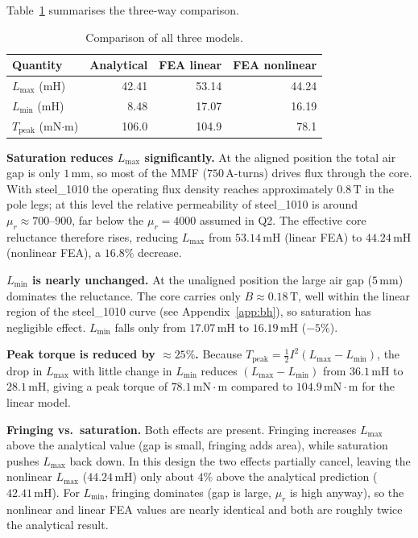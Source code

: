 \documentclass[12pt,a4paper]{article}
\newcommand{\unit}[1]{\,\mathrm{#1}}
\begin{document}
Table~\ref{tab:nl_comparison} summarises the three-way comparison.

\begin{table}[H]
  \centering
  \caption{Comparison of all three models.}
  \label{tab:nl_comparison}
  \renewcommand{\arraystretch}{1.3}
  \begin{tabular}{|l|r|r|r|}
    \hline
    \textbf{Quantity} & \textbf{Analytical} & \textbf{FEA linear} & \textbf{FEA nonlinear} \\
    \hline
    $L_{\max}$ (mH)                   & 42.41 & 53.14 & 44.24 \\
    $L_{\min}$ (mH)                   &  8.48 & 17.07 & 16.19 \\
    $T_{\mathrm{peak}}$ (mN$\cdot$m)  & 106.0 & 104.9 & 78.1  \\
    \hline
  \end{tabular}
\end{table}

\textbf{Saturation reduces $L_{\max}$ significantly.}
At the aligned position the total air gap is only $1\unit{mm}$, so most
of the MMF ($750\unit{A\text{-}turns}$) drives flux through the core.
With steel\_1010 the operating flux density reaches approximately
$0.8\unit{T}$ in the pole legs; at this level the relative permeability
of steel\_1010 is around $\mu_r \approx 700\text{--}900$, far below the
$\mu_r = 4000$ assumed in Q2.  The effective core reluctance therefore
rises, reducing $L_{\max}$ from $53.14\unit{mH}$ (linear FEA) to
$44.24\unit{mH}$ (nonlinear FEA), a $16.8\%$ decrease.

\textbf{$L_{\min}$ is nearly unchanged.}
At the unaligned position the large air gap ($5\unit{mm}$) dominates
the reluctance.  The core carries only $B \approx 0.18\unit{T}$, well
within the linear region of the steel\_1010 curve (see
Appendix~\ref{app:bh}), so saturation has negligible effect.
$L_{\min}$ falls only from $17.07\unit{mH}$ to $16.19\unit{mH}$
($-5\%$).

\textbf{Peak torque is reduced by $\approx 25\%$.}
Because $T_{\mathrm{peak}} = \tfrac{1}{2}I^{2}(L_{\max}-L_{\min})$,
the drop in $L_{\max}$ with little change in $L_{\min}$ reduces
$(L_{\max}-L_{\min})$ from $36.1\unit{mH}$ to $28.1\unit{mH}$, giving
a peak torque of $78.1\unit{mN\cdot m}$ compared to
$104.9\unit{mN\cdot m}$ for the linear model.

\textbf{Fringing vs.\ saturation.}
Both effects are present.  Fringing increases $L_{\max}$ above the
analytical value (gap is small, fringing adds area), while saturation
pushes $L_{\max}$ back down.  In this design the two effects partially
cancel, leaving the nonlinear $L_{\max}$ ($44.24\unit{mH}$) only about
$4\%$ above the analytical prediction ($42.41\unit{mH}$).  For
$L_{\min}$, fringing dominates (gap is large, $\mu_r$ is high anyway),
so the nonlinear and linear FEA values are nearly identical and both are
roughly twice the analytical result.
\end{document}
